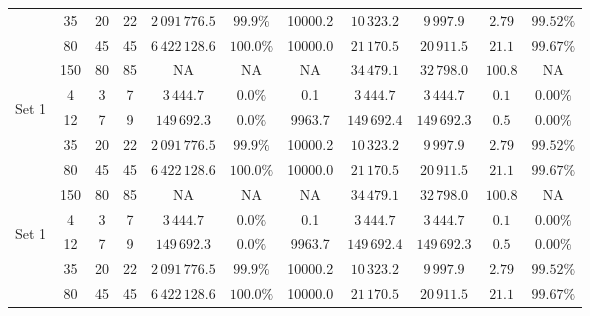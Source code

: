 \documentclass[../main.tex]{subfiles}
\begin{document}
\begin{table}
\begin{adjustbox}{width=0.95\columnwidth,center}
\begin{tabular}{|cccc|ccc|ccc|c|}
                        & 35      & 20    & 22    & $2\,091\,776.5$ & $99.9\%$      & 10000.2   & $10\,323.2$   & $9\,997.9$      & $2.79$   & $99.52\%$  \\
                        & 80      & 45    & 45    & $6\,422\,128.6$ & $100.0\%$     & 10000.0   & $21\,170.5$   & $20\,911.5$  & $21.1$   & $99.67\%$  \\
                        & 150     & 80    & 85    & NA              & NA            & NA        & $34\,479.1$   & $32\,798.0$  & $100.8$   & NA  \\
            \hline
                \multirow{5}{*}{\begin{sideways} Set 1 \end{sideways}}  
                        & 4       & 3     & 7     & $3\,444.7$      & $0.0\%$       & 0.1       & $3\,444.7$    & $3\,444.7$    & $0.1$        & $0.00\%$  \\
                        & 12      & 7     & 9     & $149\,692.3$    & $0.0\%$       & 9963.7    & $149\,692.4$   & $149\,692.3$  & $0.5$   & $0.00\%$  \\
                        & 35      & 20    & 22    & $2\,091\,776.5$ & $99.9\%$      & 10000.2   & $10\,323.2$   & $9\,997.9$      & $2.79$   & $99.52\%$  \\
                        & 80      & 45    & 45    & $6\,422\,128.6$ & $100.0\%$     & 10000.0   & $21\,170.5$   & $20\,911.5$  & $21.1$   & $99.67\%$  \\
                        & 150     & 80    & 85    & NA              & NA            & NA        & $34\,479.1$   & $32\,798.0$  & $100.8$   & NA  \\
            \hline
                \multirow{5}{*}{\begin{sideways} Set 1 \end{sideways}}  
                        & 4       & 3     & 7     & $3\,444.7$      & $0.0\%$       & 0.1       & $3\,444.7$    & $3\,444.7$    & $0.1$        & $0.00\%$  \\
                        & 12      & 7     & 9     & $149\,692.3$    & $0.0\%$       & 9963.7    & $149\,692.4$   & $149\,692.3$  & $0.5$   & $0.00\%$  \\
                        & 35      & 20    & 22    & $2\,091\,776.5$ & $99.9\%$      & 10000.2   & $10\,323.2$   & $9\,997.9$      & $2.79$   & $99.52\%$  \\
                        & 80      & 45    & 45    & $6\,422\,128.6$ & $100.0\%$     & 10000.0   & $21\,170.5$   & $20\,911.5$  & $21.1$   & $99.67\%$  \\

\end{tabular}
\end{adjustbox}
\end{table}
\end{document}
